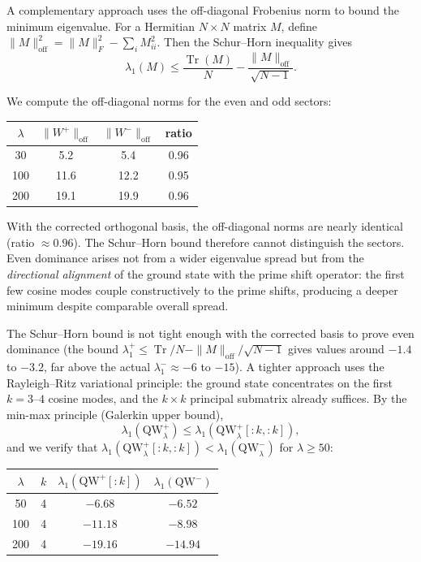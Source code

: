 \documentclass[12pt,a4paper]{article}
\theoremstyle{definition}
\theoremstyle{remark}
\begin{document}
A complementary approach uses the off-diagonal Frobenius norm to bound the minimum eigenvalue. For a Hermitian $N \times N$ matrix $M$, define $\|M\|_{\mathrm{off}}^2 = \|M\|_F^2 - \sum_i M_{ii}^2$. Then the Schur--Horn inequality gives
\[ \lambda_1(M) \leq \frac{\operatorname{Tr}(M)}{N} - \frac{\|M\|_{\mathrm{off}}}{\sqrt{N-1}}. \]

We compute the off-diagonal norms for the even and odd sectors:

\begin{center}
\begin{tabular}{cccc}
$\lambda$ & $\|W^+\|_{\mathrm{off}}$ & $\|W^-\|_{\mathrm{off}}$ & ratio \\
\hline
30  & 5.2 & 5.4 & 0.96 \\
100 & 11.6 & 12.2 & 0.95 \\
200 & 19.1 & 19.9 & 0.96
\end{tabular}
\end{center}

With the corrected orthogonal basis, the off-diagonal norms are nearly identical (ratio $\approx 0.96$). The Schur--Horn bound therefore cannot distinguish the sectors. Even dominance arises not from a wider eigenvalue spread but from the \emph{directional alignment} of the ground state with the prime shift operator: the first few cosine modes couple constructively to the prime shifts, producing a deeper minimum despite comparable overall spread.

The Schur--Horn bound is not tight enough with the corrected basis to prove even dominance (the bound $\lambda_1^+ \leq \operatorname{Tr}/N - \|M\|_{\mathrm{off}}/\sqrt{N-1}$ gives values around $-1.4$ to $-3.2$, far above the actual $\lambda_1^- \approx -6$ to $-15$). A tighter approach uses the Rayleigh--Ritz variational principle: the ground state concentrates on the first $k = 3$--$4$ cosine modes, and the $k \times k$ principal submatrix already suffices. By the min-max principle (Galerkin upper bound),
\[ \lambda_1(\mathrm{QW}_\lambda^+) \leq \lambda_1(\mathrm{QW}_\lambda^+[{:}k,{:}k]), \]
and we verify that $\lambda_1(\mathrm{QW}_\lambda^+[{:}k,{:}k]) < \lambda_1(\mathrm{QW}_\lambda^-)$ for $\lambda \geq 50$:

\begin{center}
\begin{tabular}{cccc}
$\lambda$ & $k$ & $\lambda_1(\mathrm{QW}^+[{:}k])$ & $\lambda_1(\mathrm{QW}^-)$ \\
\hline
50  & 4 & $-6.68$ & $-6.52$ \\
100 & 4 & $-11.18$ & $-8.98$ \\
200 & 4 & $-19.16$ & $-14.94$
\end{tabular}
\end{center}
\end{document}
